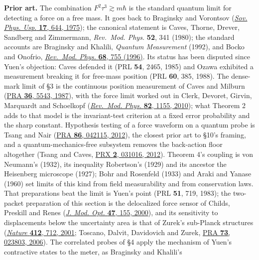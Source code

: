 \documentclass[11pt,a4paper]{article}
\begin{document}
\textbf{Prior art.} The combination \(F^2\tau^3\gtrsim m\hbar\) is the
standard quantum limit for detecting a force on a free mass. It goes
back to Braginsky and Vorontsov
(\href{https://doi.org/10.1070/PU1975v017n05ABEH004362}{\emph{Sov. Phys.
Usp.} \textbf{17}, 644, 1975}); the canonical statement is Caves,
Thorne, Drever, Sandberg and Zimmermann, \emph{Rev.~Mod. Phys.}
\textbf{52}, 341 (1980); the standard accounts are Braginsky and
Khalili, \emph{Quantum Measurement} (1992), and Bocko and Onofrio,
\href{https://doi.org/10.1103/RevModPhys.68.755}{\emph{Rev.~Mod. Phys.}
\textbf{68}, 755 (1996)}. Its status has been disputed since Yuen's
objection: Caves defended it (PRL \textbf{54}, 2465, 1985) and Ozawa
exhibited a measurement breaking it for free-mass position (PRL
\textbf{60}, 385, 1988). The dense-mark limit of §3 is the continuous
position measurement of Caves and Milburn
(\href{https://doi.org/10.1103/PhysRevA.36.5543}{PRA \textbf{36}, 5543,
1987}), with the force limit worked out in Clerk, Devoret, Girvin,
Marquardt and Schoelkopf
(\href{https://doi.org/10.1103/RevModPhys.82.1155}{\emph{Rev.~Mod.
Phys.} \textbf{82}, 1155, 2010}); what Theorem 2 adds to that model is
the invariant-test criterion at a fixed error probability and the sharp
constant. Hypothesis testing of a force waveform on a quantum probe is
Tsang and Nair (\href{https://doi.org/10.1103/PhysRevA.86.042115}{PRA
\textbf{86}, 042115, 2012}), the closest prior art to §10's framing, and
a quantum-mechanics-free subsystem removes the back-action floor
altogether (Tsang and Caves,
\href{https://doi.org/10.1103/PhysRevX.2.031016}{PRX \textbf{2}, 031016,
2012}). Theorem 4's coupling is von Neumann's (1932), its inequality
Robertson's (1929) and its ancestor the Heisenberg microscope (1927);
Bohr and Rosenfeld (1933) and Araki and Yanase (1960) set limits of this
kind from field measurability and from conservation laws. That
preparations beat the limit is Yuen's point (PRL \textbf{51}, 719,
1983); the two-packet preparation of this section is the delocalized
force sensor of Childs, Preskill and Renes
(\href{https://doi.org/10.1080/09500340008244034}{\emph{J. Mod. Opt.}
\textbf{47}, 155, 2000}), and its sensitivity to displacements below the
uncertainty area is that of Zurek's sub-Planck structures
(\href{https://doi.org/10.1038/35089017}{\emph{Nature} \textbf{412},
712, 2001}; Toscano, Dalvit, Davidovich and Zurek,
\href{https://doi.org/10.1103/PhysRevA.73.023803}{PRA \textbf{73},
023803, 2006}). The correlated probes of §4 apply the mechanism of
Yuen's contractive states to the meter, as Braginsky and Khalili's
\end{document}
